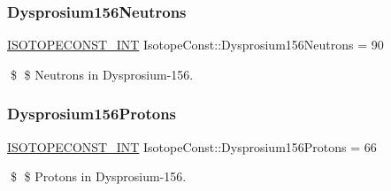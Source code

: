 \subsubsection{\texorpdfstring{Dysprosium156\+Neutrons}{Dysprosium156Neutrons}}
{\footnotesize\ttfamily \mbox{\hyperlink{group___isotope_const-_macros_ga5f18360b3e99483a35c32d789e62621c}{I\+S\+O\+T\+O\+P\+E\+C\+O\+N\+S\+T\+\_\+\+I\+NT}} Isotope\+Const\+::\+Dysprosium156\+Neutrons = 90}

\$ \$ Neutrons in Dysprosium-\/156. \mbox{\label{group___isotope_const-_dysprosium-_dy156_ga0890c9061245cc1f326a0abd3d90bc5a}} 
\subsubsection{\texorpdfstring{Dysprosium156\+Protons}{Dysprosium156Protons}}
{\footnotesize\ttfamily \mbox{\hyperlink{group___isotope_const-_macros_ga5f18360b3e99483a35c32d789e62621c}{I\+S\+O\+T\+O\+P\+E\+C\+O\+N\+S\+T\+\_\+\+I\+NT}} Isotope\+Const\+::\+Dysprosium156\+Protons = 66}

\$ \$ Protons in Dysprosium-\/156. 